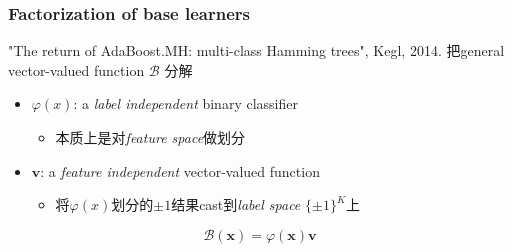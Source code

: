 \documentclass{beamer}
\begin{document}
\begin{frame}
\frametitle{Factorization of base learners}

{\color{purple} "The return of AdaBoost.MH: multi-class Hamming trees", Kegl, 2014.}
把general vector-valued function $\mathcal{B}$ 分解
\begin{itemize}
\item $\varphi(x)$: a \textit{label independent} binary classifier 
  \begin{itemize}
    \item 本质上是对\textit{feature space}做划分
  \end{itemize}
\item $\mathbf{v}$: a \textit{feature independent} vector-valued function
  \begin{itemize}
    \item 将$\varphi(x)$划分的${\pm 1}$结果cast到\textit{label space} $\{\pm 1\}^K$上
  \end{itemize}
\end{itemize}
\begin{block}{}
$$\mathcal{B}(\mathbf{x}) = \varphi(\mathbf{x}) \mathbf{v}$$
\end{block}
\end{frame}
\end{document}
